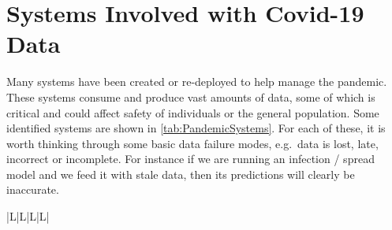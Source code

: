 \section{Systems Involved with Covid-19 Data}
Many systems have been created or re-deployed to help manage the pandemic. These systems consume and produce vast amounts of data, some of which is critical and could affect safety of individuals or the general population. Some identified systems are shown in \autoref{tab:PandemicSystems}. For each of these, it is worth thinking through some basic data failure modes, e.g.\ data is lost, late, incorrect or incomplete. For instance if we are running an infection / spread model and we feed it with stale data, then its predictions will clearly be inaccurate.
\begin{longtable}{|L{}|L{}|L{}|L{}|}
  \caption{Systems involving data used to manage the pandemic}
  \label{tab:PandemicSystems}
  \\\hline
  \endfirsthead
  \caption[]{Systems involving data Used to manage the pandemic (continued)}
  \\\hline
  \endhead
  \endfoot\endlastfoot


\end{longtable}
